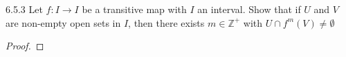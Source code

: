 \begin{problem}{6.5.3}
  Let $f: I\to I$ be a transitive map with $I$ an interval. Show that if $U$ and $V$
  are non-empty open sets in $I$, then there exists $m\in\mathbb{Z}^+$ with $U \cap f^m(V) \neq \emptyset$
\end{problem}

\begin{proof}
\end{proof}
\newpage

